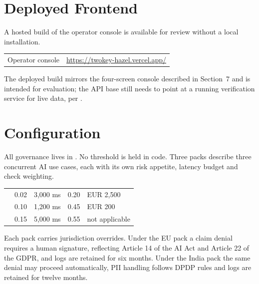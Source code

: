 \documentclass[10pt]{article}
\begin{document}
\section{Deployed Frontend}
 
A hosted build of the operator console is available for review without a local
installation.
 
\vspace{2pt}
{\small
\begin{xltabular}{\textwidth}{@{}L{0.22\textwidth}Y@{}}
\toprule
{} &  \\
\midrule
Operator console & \url{https://twokey-hazel.vercel.app/} \\
\bottomrule
\end{xltabular}}
 
The deployed build mirrors the four-screen console described in Section~7 and is
intended for evaluation; the API base still needs to point at a running verification
service for live data, per .

\section{Configuration}

All governance lives in . No threshold is held in code. Three packs
describe three concurrent AI use cases, each with its own risk appetite, latency budget
and check weighting.

\vspace{2pt}
{\small
\begin{xltabular}{\textwidth}{@{}YR{0.10\textwidth}R{0.16\textwidth}R{0.14\textwidth}R{0.16\textwidth}@{}}
\toprule
{} &  &  &  &  \\
\midrule
{} & 0.02 & 3,000 ms & 0.20 & EUR 2,500 \\
 & 0.10 & 1,200 ms & 0.45 & EUR 200 \\
 & 0.15 & 5,000 ms & 0.55 & not applicable \\
\bottomrule
\end{xltabular}}

Each pack carries jurisdiction overrides. Under the EU pack a claim denial requires a
human signature, reflecting Article 14 of the AI Act and Article 22 of the GDPR, and logs
are retained for six months. Under the India pack the same denial may proceed
automatically, PII handling follows DPDP rules and logs are retained for twelve months.
\end{document}

